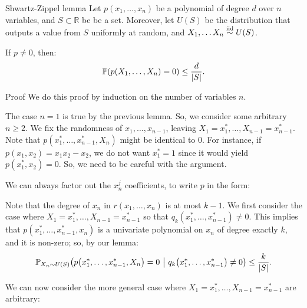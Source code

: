 \documentclass[a4paper]{article}
\begin{document}
\begin{parag}{Shwartz-Zippel lemma}
    Let $p\left(x_1, \ldots, x_n\right)$ be a polynomial of degree $d$ over $n$ variables, and $S \subset \mathbb{R}$ be be a set. Moreover, let $U\left(S\right)$ be the distribution that outputs a value from $S$ uniformly at random, and $X_1, \ldots X_n \iid U\left(S\right)$.

    If $p \neq 0$, then: 
    \[\prob\left(p\left(X_1, \ldots, X_n\right) = 0\right) \leq \frac{d}{\left|S\right|}.\]
    
    \begin{subparag}{Proof}
        We do this proof by induction on the number of variables $n$. 

        The case $n = 1$ is true by the previous lemma. So, we consider some arbitrary $n \geq 2$. We fix the randomness of $x_1, \ldots, x_{n-1}$, leaving $X_1 = x_1^*, \ldots, X_{n-1} = x_{n-1}^*$. Note that $p\left(x_1^*, \ldots, x_{n-1}^*, X_n\right)$ might be identical to 0. For instance, if $p\left(x_1, x_2\right) = x_1 x_2 - x_2$, we do not want $x_1^* = 1$ since it would yield $p\left(x_1^*, x_2\right) = 0$. So, we need to be careful with the argument.

        We can always factor out the $x_n^j$ coefficients, to write $p$ in the form: 

        Note that the degree of $x_n$ in $r\left(x_1, \ldots, x_{n}\right)$ is at most $k-1$. We first consider the case where $X_1 = x_1^*, \ldots, X_{n-1} = x_{n-1}^*$ so that $q_k\left(x_1^*, \ldots, x_{n-1}^*\right) \neq 0$. This implies that $p\left(x_1^*, \ldots, x_{n-1}^*, x_n\right)$ is a univariate polynomial on $x_n$ of degree exactly $k$, and it is non-zero; so, by our lemma:
        \[\prob_{X_n \followsdistr U\left(S\right)}\left(p\left(x_1^*, \ldots, x_{n-1}^*, X_n\right) = 0 \suchthat q_k\left(x_1^*, \ldots, x_{n-1}^*\right) \neq 0\right) \leq \frac{k}{\left|S\right|}.\] 
        
        We can now consider the more general case where $X_1 = x_1^*, \ldots, X_{n-1} = x_{n-1}^*$ are arbitrary:


\end{subparag}
\end{parag}
\end{document}

